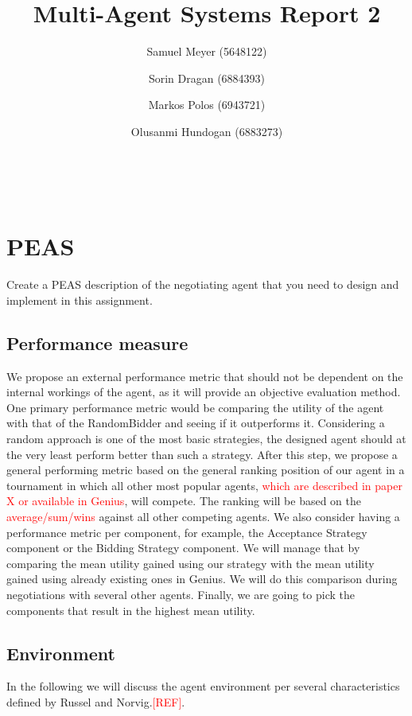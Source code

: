 \documentclass[a4paper,11pt]{article}
\makeatletter
\theoremstyle{mytheor}
\renewcommand{\maketitle}{
\begin{center}
\vspace{2ex}
{\huge \textsc{\@title}}
\vspace{1ex}
\\
\begin{center}
\@author
\end{center}
\end{center}
}
\makeatother
\begin{document}
\title{Multi-Agent Systems Report 2}

\author{Samuel Meyer (5648122) \and Sorin Dragan (6884393) \and Markos Polos (6943721) \and Olusanmi Hundogan (6883273)}

\maketitle

% 
\section{PEAS}
Create a PEAS description of the negotiating agent that you need to design and implement in this assignment. 
\subsection{Performance measure}
We propose an external performance metric that should not be dependent on the internal workings of the agent, as it will provide an objective evaluation method. One primary performance metric would be comparing the utility of the agent with that of the RandomBidder and seeing if it outperforms it. Considering a random approach is one of the most basic strategies, the designed agent should at the very least perform better than such a strategy. After this step, we propose a general performing metric based on the general ranking position of our agent in a tournament in which all other most popular agents, \textcolor{red}{which are described in paper X or available in Genius}, will compete. 
The ranking will be based on the \textcolor{red}{average/sum/wins} against all other competing agents.
We also consider having a performance metric per component, for example, the Acceptance Strategy component or the Bidding Strategy component. We will manage that by comparing the mean utility gained using our strategy with the mean utility gained using already existing ones in Genius. We will do this comparison during negotiations with several other agents. Finally, we are going to pick the components that result in the highest mean utility.

\subsection{Environment} %
In the following we will discuss the agent environment per several characteristics defined by Russel and Norvig.\textcolor{red}{[REF]}. 
\end{document}
